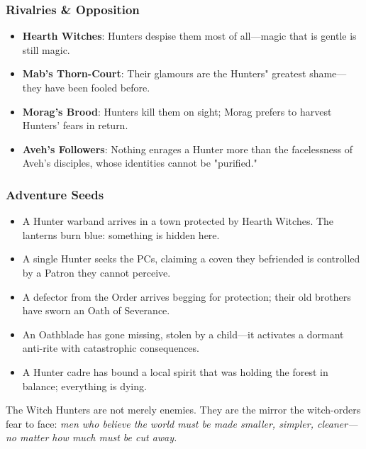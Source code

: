 \documentclass[11pt]{book}
\begin{document}
\subsubsection{Rivalries \& Opposition}
\begin{itemize}
    \item \textbf{Hearth Witches}:  
    Hunters despise them most of all---magic that is gentle is still magic.

    \item \textbf{Mab's Thorn-Court}:  
    Their glamours are the Hunters" greatest shame---they have been fooled before.

    \item \textbf{Morag's Brood}:  
    Hunters kill them on sight; Morag prefers to harvest Hunters' fears in return.

    \item \textbf{Aveh's Followers}:  
    Nothing enrages a Hunter more than the facelessness of Aveh's disciples, whose identities cannot be "purified."
\end{itemize}

\subsubsection{Adventure Seeds}
\begin{itemize}
    \item A Hunter warband arrives in a town protected by Hearth Witches.  
    The lanterns burn blue: something is hidden here.

    \item A single Hunter seeks the PCs, claiming a coven they befriended is controlled by a Patron they cannot perceive.

    \item A defector from the Order arrives begging for protection; their old brothers have sworn an Oath of Severance.

    \item An Oathblade has gone missing, stolen by a child---it activates a dormant anti-rite with catastrophic consequences.

    \item A Hunter cadre has bound a local spirit that was holding the forest in balance; everything is dying.
\end{itemize}

\medskip

\noindent The Witch Hunters are not merely enemies.  
They are the mirror the witch-orders fear to face:  
\textit{men who believe the world must be made smaller, simpler, cleaner---no matter how much must be cut away.}
\end{document}

